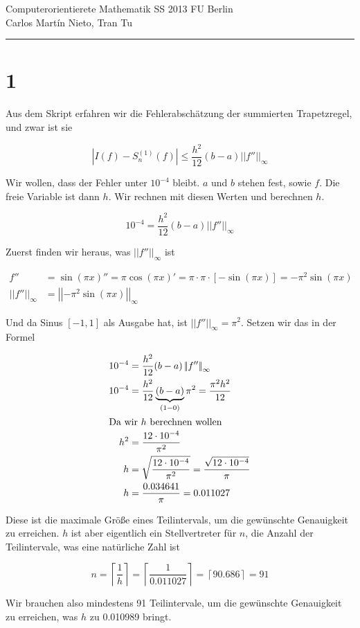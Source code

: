 \documentclass[ngerman,a4paper]{scrartcl}
\newcommand{\norm}[1]{\left|\!\left|#1\right|\! \right|}
\begin{document}
{\sffamily
  \hfill
  Computerorientierete Mathematik SS 2013\hfill
  FU Berlin\\[8pt]
  \hfill Carlos Martín Nieto, Tran Tu\hrule \bigskip
}

\section*{1}

Aus dem Skript erfahren wir die Fehlerabschätzung der summierten Trapetzregel, und zwar ist sie

\[
|I(f) - S^{(1)}_n(f)| \leq \frac{h^2}{12}(b-a)\norm{f''}_\infty
\]

Wir wollen, dass der Fehler unter $10^{-4}$ bleibt. $a$ und $b$ stehen fest, sowie $f$. Die freie Variable ist dann $h$. Wir rechnen mit diesen Werten und berechnen $h$.

\[
  10^{-4} = \frac{h^2}{12} (b-a) \norm{f''}_\infty
\]

Zuerst finden wir heraus, was $\norm{f''}_\infty$ ist


\begin{align*}
  f'' &= \sin(\pi x)'' = \pi \cos(\pi x)' = \pi \cdot \pi \cdot       [-\sin(\pi x)] = -\pi^2 \sin(\pi x)\\
\norm{f''}_\infty &= \norm{-\pi^2 \sin(\pi x)}_\infty
\end{align*}

Und da Sinus $[-1, 1]$ als Ausgabe hat, ist $\norm{f''}_\infty = \pi^2$. Setzen wir das in der Formel

\begin{align*}
  10^{-4} &= \frac{h^2}{12} (b-a) \norm{f''}_\infty\\
  10^{-4} &= \frac{h^2}{12} \underbrace{(b-a)}_{(1 - 0)} \pi^2 = \frac{\pi^2 h^2}{12}\\
\intertext{Da wir $h$ berechnen wollen}
h^2 &= \frac{12\cdot 10^{-4}}{\pi^2}\\
h &= \sqrt{\frac{12\cdot 10^{-4}}{\pi^2}} = \frac{\sqrt{12\cdot 10^{-4}}}{\pi}\\
h &= \frac{0.034641}{\pi} = 0.011027
\end{align*}

Diese ist die maximale Größe eines Teilintervals, um die gewünschte Genauigkeit zu erreichen. $h$ ist aber eigentlich ein Stellvertreter für $n$, die Anzahl der Teilintervale, was eine natürliche Zahl ist

\[
n = \left\lceil \frac{1}{h} \right\rceil = \left\lceil \frac{1}{0.011027} \right\rceil = \left\lceil 90.686 \right\rceil = 91
\]

Wir brauchen also mindestens 91 Teilintervale, um die gewünschte Genauigkeit zu erreichen, was $h$ zu 0.010989 bringt.
\end{document}
